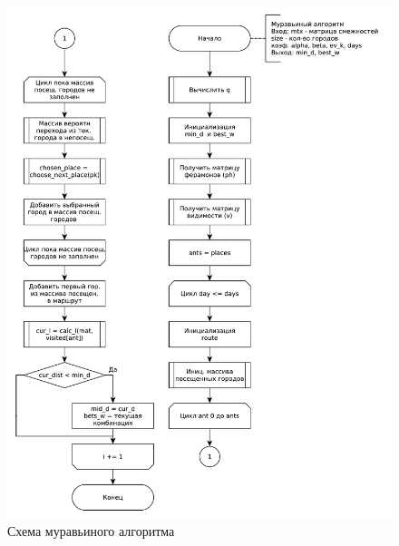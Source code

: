 \begin{figure}[ht!]
	\centering
	\includegraphics[width=1\linewidth]{assets/graphs/angs.pdf}
	\caption{Схема муравьиного алгоритма}
	\label{fig:angs}
\end{figure}


